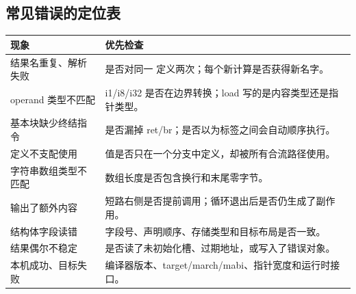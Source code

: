 \subsection{常见错误的定位表}
\begin{tabularx}{\linewidth}{@{}p{47mm}Y@{}}
\toprule
现象 & 优先检查 \\
\midrule
结果名重复、解析失败 & 是否对同一  定义两次；每个新计算是否获得新名字。\\
operand 类型不匹配 & i1/i8/i32 是否在边界转换；load 写的是内容类型还是指针类型。\\
基本块缺少终结指令 & 是否漏掉 ret/br；是否以为标签之间会自动顺序执行。\\
定义不支配使用 & 值是否只在一个分支中定义，却被所有合流路径使用。\\
字符串数组类型不匹配 & 数组长度是否包含换行和末尾零字节。\\
输出了额外内容 & 短路右侧是否提前调用；循环退出后是否仍生成了副作用。\\
结构体字段读错 & 字段号、声明顺序、存储类型和目标布局是否一致。\\
结果偶尔不稳定 & 是否读了未初始化槽、过期地址，或写入了错误对象。\\
本机成功、目标失败 & 编译器版本、target/march/mabi、指针宽度和运行时接口。\\
\bottomrule
\end{tabularx}


